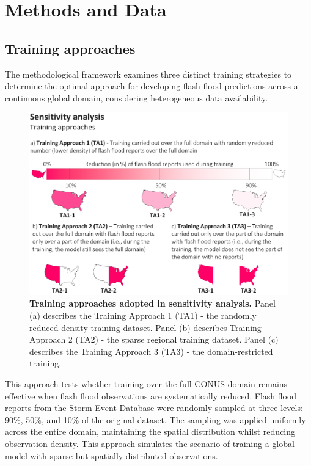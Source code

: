 

\section{Methods and Data}
\label{regional_to_global_training_methods_data}

\subsection{Training approaches}
The methodological framework examines three distinct training strategies to determine the optimal approach for developing flash flood predictions across a continuous global domain, considering heterogeneous data availability. 

\begin{figure}[htbp]
\centering
\includegraphics[width=\textwidth]{training_approaches.png}
\caption{\textbf{Training approaches adopted in sensitivity analysis.} Panel (a) describes the Training Approach 1 (TA1) - the randomly reduced-density training dataset. Panel (b) describes Training Approach 2 (TA2) - the sparse regional training dataset. Panel (c) describes the Training Approach 3 (TA3) - the domain-restricted training.}
\label{fig:training_approaches}
\end{figure}

This  approach tests whether training over the full CONUS domain remains effective when flash flood observations are systematically reduced. Flash flood reports from the Storm Event Database were randomly sampled at three levels: 90\%, 50\%, and 10\% of the original dataset. The sampling was applied uniformly across the entire domain, maintaining the spatial distribution whilst reducing observation density. This approach simulates the scenario of training a global model with sparse but spatially distributed observations.

